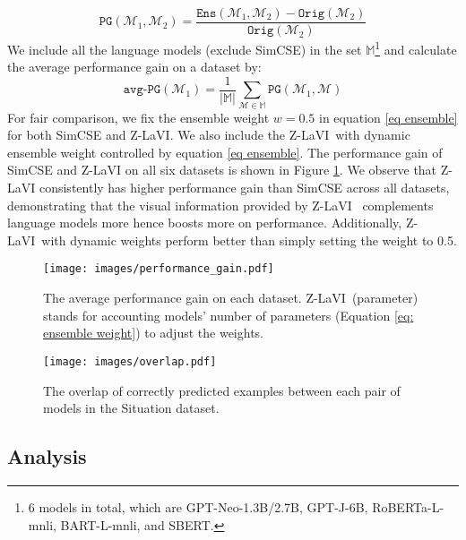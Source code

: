 \documentclass[11pt]{article}
\newcommand{\model}{Z-LaVI}
\begin{document}
\vspace{-.2cm}
 \begin{equation}
    \texttt{PG}(\mathcal{M}_{1}, \mathcal{M}_{2}) = \frac{\texttt{Ens} (\mathcal{M}_{1}, \mathcal{M}_{2}) - \texttt{Orig} (\mathcal{M}_{2})}{\texttt{Orig}(\mathcal{M}_{2})}
\end{equation}
We include all the language models (exclude SimCSE) in the set $\mathbb{M}$\footnote{6 models in total, which are GPT-Neo-1.3B/2.7B, GPT-J-6B, RoBERTa-L-mnli, BART-L-mnli, and SBERT.} and calculate the average performance gain on a dataset by:
\begin{equation}
    \texttt{avg-PG}(\mathcal{M}_{1}) = \frac{1}{|\mathbb{M}|} \sum_{\mathcal{M} \in \mathbb{M}} \texttt{PG}(\mathcal{M}_{1}, \mathcal{M})
\end{equation}
For fair comparison, we fix the ensemble weight $w = 0.5$ in equation \eqref{eq ensemble} for both SimCSE and \model. We also include the \model~with dynamic ensemble weight controlled by equation \eqref{eq ensemble}. The performance gain of SimCSE and Z-LaVI on all six datasets is shown in Figure \ref{fig:pg}. We observe that Z-LaVI consistently has higher performance gain than SimCSE across all datasets, demonstrating that the visual information provided by \model~
complements language models more hence boosts more on performance.
Additionally, \model~with dynamic weights perform better than simply setting the weight to 0.5. 

\begin{figure}[!t]
\centering
    \texttt{[image: images/performance\_gain.pdf]}
    \caption{The average performance gain on each dataset. \model~(parameter) stands for accounting models' number of parameters (Equation \ref{eq: ensemble weight}) to adjust the weights.}
    \label{fig:pg}
\end{figure}

\begin{figure}[!t]
\centering
    \texttt{[image: images/overlap.pdf]}
    \caption{The overlap of correctly predicted examples between each pair of models in the Situation dataset.}
    \label{fig:overlap}
\end{figure}

\subsection{Analysis}
\end{document}

